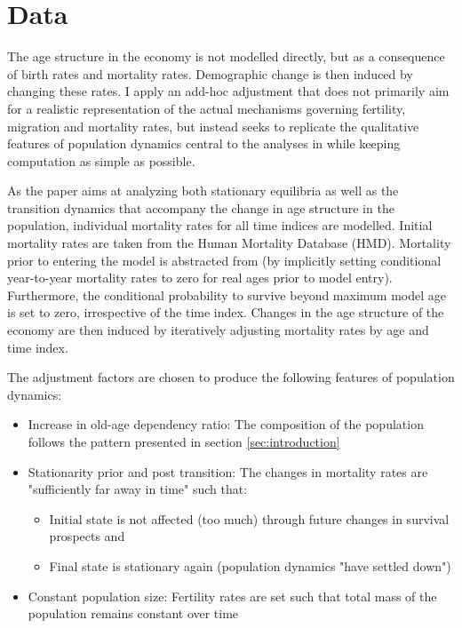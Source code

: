 \section{Data}
\label{sec:data}

The age structure in the economy is not modelled directly, but as a consequence of birth rates and mortality rates. Demographic change is then induced by changing these rates. I apply an add-hoc adjustment that does not primarily aim for a realistic representation of the actual mechanisms governing fertility, migration and mortality rates, but instead seeks to replicate the qualitative features of population dynamics central to the analyses in \cite{LudwigSchelkleVogel2012} while keeping computation as simple as possible.

As the paper aims at analyzing both stationary equilibria as well as the transition dynamics that accompany the change in age structure in the population, individual mortality rates for all time indices are modelled. Initial mortality rates are taken from the Human Mortality Database (HMD). Mortality prior to entering the model is abstracted from (by implicitly setting conditional year-to-year mortality rates to zero for real ages prior to model entry). Furthermore, the conditional probability to survive beyond maximum model age is set to zero, irrespective of the time index. Changes in the age structure of the economy are then induced by iteratively adjusting mortality rates by age and time index.

The adjustment factors are chosen to produce the following features of population dynamics:
\begin{itemize}
    \item Increase in old-age dependency ratio: The composition of the population follows the pattern presented in section \ref{sec:introduction}
    \item Stationarity prior and post transition: The changes in mortality rates are "sufficiently far away in time" such that:
        \begin{itemize}
            \item Initial state is not affected (too much) through future changes in survival prospects and
            \item Final state is stationary again (population dynamics "have settled down")
        \end{itemize}
    \item Constant population size: Fertility rates are set such that total mass of the population remains constant over time
\end{itemize}

